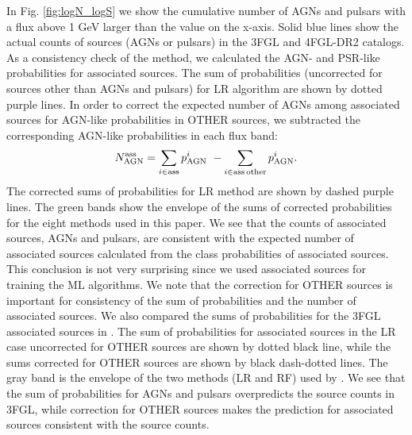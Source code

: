 \documentclass[referee]{aa} %
\newcommand{\bea}{\begin{eqnarray}}
\newcommand{\eea}{\end{eqnarray}}
\newcommand{\lb}{\label}
\begin{document}
In Fig. \ref{fig:logN_logS} we show the cumulative number of AGNs and pulsars with a flux above 1 GeV larger than the
value on the x-axis.
Solid blue lines show the actual counts of sources (AGNs or pulsars) in the 3FGL and 4FGL-DR2 catalogs.
As a consistency check of the method, we calculated the AGN- and PSR-like probabilities for associated sources.
The sum of probabilities (uncorrected for sources other than AGNs and pulsars) for LR algorithm are shown by dotted purple lines.
In order to correct the expected number of AGNs among associated sources for AGN-like probabilities in OTHER sources, 
we subtracted the corresponding AGN-like probabilities in each flux band:
\bea
\lb{eq:assoc_ev}
N_{\rm AGN}^{\rm ass}  = \sum_{i \in \rm ass} p^i_{\rm AGN}\,\, - \sum_{i \in \rm ass\,other} p^i_{\rm AGN}.
\eea
The corrected sums of probabilities for LR method are shown by dashed purple lines.
The green bands show the envelope of the sums of corrected probabilities for the eight methods used in this paper.
We see that the counts of associated sources, AGNs and pulsars, are consistent with the expected number of associated sources
calculated from the class probabilities of associated sources.
This conclusion is not very surprising since we used associated sources for training the ML algorithms.
We note that the correction for OTHER sources is important for consistency of the sum of probabilities and the number of associated sources.
We also compared the sums of probabilities for the 3FGL associated sources in \cite{2016ApJ...820....8S}.
The sum of probabilities for associated sources in the LR case uncorrected for OTHER sources are shown by dotted black line,
while the sums corrected for OTHER sources are shown by black dash-dotted lines.
The gray band is the envelope of the two methods (LR and RF) used by \cite{2016ApJ...820....8S}.
We see that the sum of probabilities for AGNs and pulsars overpredicts the source counts in 3FGL, 
while correction for OTHER sources makes the prediction for associated sources consistent with the source counts.
\end{document}
